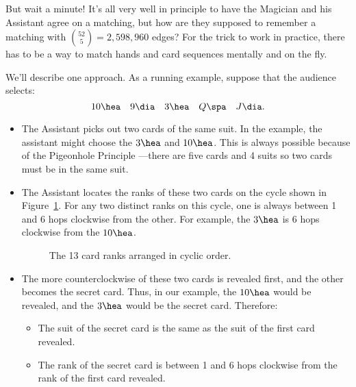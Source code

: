 But wait a minute!  It's all very well in principle to have the Magician
and his Assistant agree on a matching, but how are they supposed to
remember a matching with $\binom{52}{5} = 2,598,960$ edges?  For the trick
to work in practice, there has to be a way to match hands and card
sequences mentally and on the fly.



We'll describe one approach.  As a running example, suppose that the
audience selects:
\[
10 \hea \quad 9 \dia \quad 3 \hea \quad Q \spa \quad J \dia.
\]

\begin{itemize}

\item The Assistant picks out two cards of the same suit.  In the
example, the assistant might choose the $3 \hea$ and $10 \hea$.  This
is always possible because of the Pigeonhole Principle ---there are
five cards and 4 suits so two cards must be in the same suit.

\item The Assistant locates the ranks of these two cards on the cycle
  shown in Figure~\ref{fig:11Q11}. For any two distinct ranks on this
  cycle, one is always between 1 and 6 hops clockwise from the other.
  For example, the $3 \hea$ is 6 hops clockwise from the $10 \hea$.


\begin{figure}


\caption{The 13 card ranks arranged in cyclic order.}

\label{fig:11Q11}

\end{figure}

\item The more counterclockwise of these two cards is revealed first,
and the other becomes the secret card.  Thus, in our example, the $10
\hea$ would be revealed, and the $3 \hea$ would be the secret card.
Therefore:

\begin{itemize}

\item The suit of the secret card is the same as the suit of the first
card revealed.

\item The rank of the secret card is between 1 and 6 hops clockwise
from the rank of the first card revealed.


\end{itemize}
\end{itemize}
